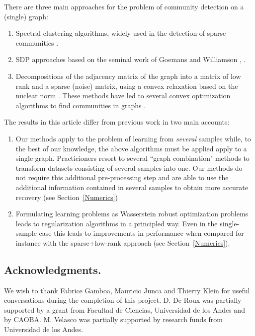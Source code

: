 \documentclass[12pt]{amsart}
\theoremstyle{remark}
\begin{document}
There are three main approaches for the problem of community detection on a (single) graph: 

\begin{enumerate}
\item Spectral clustering algorithms, widely used in the detection of sparse communities \cite{bordenave2015non, chin2015stochastic,krzakala2013spectral, massoulie2014community}. 

\item SDP approaches based on the seminal work of Goemans and Williamson \cite{goemans1995improved}, \cite{abbe2016exact,guedon2016community, montanari2016semidefinite}.

\item Decompositions of the adjacency matrix of the graph into a matrix of low rank and a sparse (noise) matrix, using a convex relaxation based on the nuclear norm \cite{candes2011robust,chandrasekaran2011rank,candes2009exact}. These methods have led to several convex optimization algorithms to find communities in graphs \cite{ames2011nuclear,vinayak2014sharp,chen2012clustering,chen2014clustering,oymak2011finding,ailon2013breaking}.

\end{enumerate}

The results in this article differ from previous work in two main accounts:

\begin{enumerate}
\item Our methods apply to the problem of learning from {\it several} samples while, to the best of our knowledge, the above algorithms must be applied apply to a single graph. Practicioners resort to several ``graph combination" methods to transform datasets consisting of several samples into one. Our methods do not require this additional pre-processing step and are able to use the additional information contained in several samples to obtain more accurate recovery (see Section~\ref{Numerics})

\item Formulating learning problems as Wasserstein robust optimization problems leads to regularization algorithms in a principled way. Even in the single-sample case this leads to improvements in performance when compared for instance with the sparse+low-rank approach (see Section~\ref{Numerics}).
\end{enumerate}


\subsection{Acknowledgments.}
We wish to thank Fabrice Gamboa, Mauricio Junca and Thierry Klein for useful conversations during the completion of this project. D. De Roux was partially supported by a grant from Facultad de Ciencias, Universidad de los Andes and by CAOBA. M. Velasco was partially supported by research funds from Universidad de los Andes. 
\end{document}
